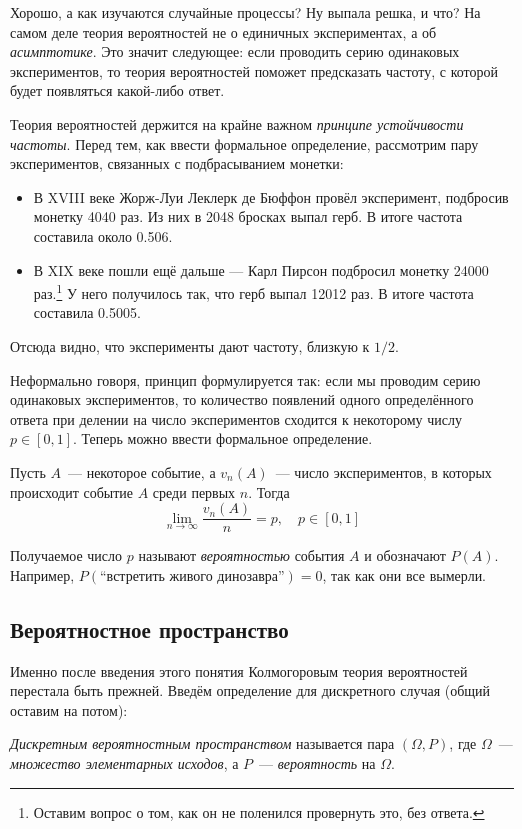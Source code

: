 \documentclass[a4paper,12pt]{article}
\begin{document}
Хорошо, а как изучаются случайные процессы? Ну выпала решка, и что? На самом деле теория вероятностей не о единичных экспериментах, а об \emph{асимптотике}. Это значит следующее: если проводить серию одинаковых экспериментов, то теория вероятностей поможет предсказать частоту, с которой будет появляться какой-либо ответ.

Теория вероятностей держится на крайне важном \emph{принципе устойчивости частоты}. Перед тем, как ввести формальное определение, рассмотрим пару экспериментов, связанных с подбрасыванием монетки:
\begin{itemize}
    \item В XVIII веке Жорж-Луи Леклерк де Бюффон провёл эксперимент, подбросив монетку 4040 раз. Из них в 2048 бросках выпал герб. В итоге частота составила около 0.506.
    \item В XIX веке пошли ещё дальше --- Карл Пирсон подбросил монетку 24000 раз.\footnote{Оставим вопрос о том, как он не поленился провернуть это, без ответа.} У него получилось так, что герб выпал 12012 раз. В итоге частота составила 0.5005.
\end{itemize}
Отсюда видно, что эксперименты дают частоту, близкую к \(1/2\). 

Неформально говоря, принцип формулируется так: если мы проводим серию одинаковых экспериментов, то количество появлений одного определённого ответа при делении на число экспериментов сходится к некоторому числу \(p \in [0, 1]\). Теперь можно ввести формальное определение.
\begin{frequency-stability}
Пусть \(A\)~--- некоторое событие, а \(v_{n}(A)\)~--- число экспериментов, в которых происходит событие \(A\) среди первых \(n\). Тогда
\[\lim_{n \to \infty}\frac{v_{n}(A)}{n} = p,\quad p \in [0, 1] \]
\end{frequency-stability}
Получаемое число \(p\) называют \emph{вероятностью} события \(A\) и обозначают \(P(A)\). Например, \(P(\text{``встретить живого динозавра''}) = 0\), так как они все вымерли.

\subsection{Вероятностное пространство}

Именно после введения этого понятия Колмогоровым теория вероятностей перестала быть прежней. Введём определение для дискретного случая (общий оставим на потом):

\begin{definition}
\emph{Дискретным вероятностным пространством} называется пара \((\Omega, P)\), где \(\Omega\)~--- \emph{множество элементарных исходов}, а \(P\)~--- \emph{вероятность} на \(\Omega\).
\end{definition}
\end{document}
